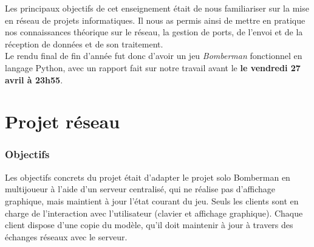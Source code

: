 \documentclass[a4paper]{article}
\begin{document}
Les principaux objectifs de cet enseignement était de nous familiariser sur la mise en réseau de projets informatiques. 
Il nous as permis ainsi de mettre en pratique nos connaissances théorique sur le réseau, la gestion de ports, de l'envoi et de la réception de données et de son traitement.
\\

Le rendu final de fin d'année fut donc d'avoir un jeu \textit{Bomberman} fonctionnel  en langage Python, avec un rapport fait sur notre travail avant le \textbf{le vendredi 27 avril à 23h55}.

\newpage
\part{Projet réseau}
	\section{Objectifs}

	Les objectifs concrets du projet était d'adapter le projet solo Bomberman en multijoueur à l'aide d'un serveur centralisé, qui ne réalise pas d'affichage graphique, mais maintient à jour l'état courant du jeu. 		Seuls les clients sont en charge de l'interaction avec l'utilisateur (clavier et affichage graphique). Chaque client dispose d'une copie du modèle, qu'il doit maintenir à jour à travers des échanges réseaux avec le serveur.
	
\end{document}
